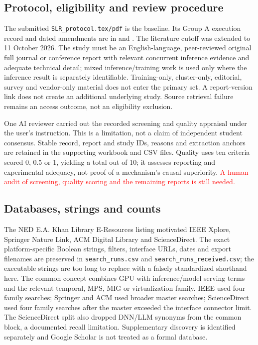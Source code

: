 \documentclass[12pt,a4paper]{article}
\newcommand{\red}[1]{\textcolor{red}{#1}}
\begin{document}
\subsection{Protocol, eligibility and review procedure}
The submitted \texttt{SLR\_protocol.tex/pdf} is the baseline. Its Group A execution record and dated amendments are in  and . The literature cutoff was extended to 11 October 2026. The study must be an English-language, peer-reviewed original full journal or conference report with relevant concurrent inference evidence and adequate technical detail; mixed inference/training work is used only where the inference result is separately identifiable. Training-only, cluster-only, editorial, survey and vendor-only material does not enter the primary set. A report-version link does not create an additional underlying study. Source retrieval failure remains an access outcome, not an eligibility exclusion.

One AI reviewer carried out the recorded screening and quality appraisal under the user's instruction. This is a limitation, not a claim of independent student consensus. Stable record, report and study IDs, reasons and extraction anchors are retained in the supporting workbook and CSV files. Quality uses ten criteria scored 0, 0.5 or 1, yielding a total out of 10; it assesses reporting and experimental adequacy, not proof of a mechanism's causal superiority. \red{A human audit of screening, quality scoring and the remaining reports is still needed.}

\subsection{Databases, strings and counts}
The NED E.A. Khan Library E-Resources listing motivated IEEE Xplore, Springer Nature Link, ACM Digital Library and ScienceDirect. The exact platform-specific Boolean strings, filters, interface URLs, dates and export filenames are preserved in \texttt{search\_runs.csv} and \texttt{search\_runs\_received.csv}; the executable strings are too long to replace with a falsely standardized shorthand here. The common concept combines GPU with inference/model serving terms and the relevant temporal, MPS, MIG or virtualization family. IEEE used four family searches; Springer and ACM used broader master searches; ScienceDirect used four family searches after the master exceeded the interface connector limit. The ScienceDirect split also dropped DNN/LLM synonyms from the common block, a documented recall limitation. Supplementary discovery is identified separately and Google Scholar is not treated as a formal database.
\end{document}
